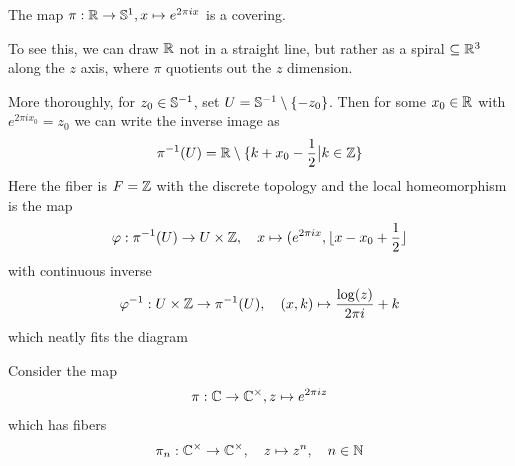 \begin{ex}[]
The map $\pi: \mathbb{R} \to \mathbb{S}^{1}, x \mapsto e^{2 \pi i x}$ is a covering.

To see this, we can draw $\mathbb{R}$ not in a straight line, but rather as a spiral $\subseteq \mathbb{R}^{3}$ along the $z$ axis, where $\pi$ quotients out the $z$ dimension.

More thoroughly, for $z_0 \in \mathbb{S}^{-1}$, set $U = \mathbb{S}^{-1}\setminus \{-z_0\}$.
Then for some $x_0 \in \mathbb{R}$ with $e^{2 \pi i x_0} = z_0$ we can write the inverse image as
\begin{align*}
  \pi^{-1}(U) = \mathbb{R} \setminus \{k + x_0 - \frac{1}{2} \big\vert k \in \mathbb{Z}\}
\end{align*}
Here the fiber is $F= \mathbb{Z}$ with the discrete topology and the local homeomorphism is the map
\begin{align*}
  \varphi: \pi^{-1}(U) \to  U \times \mathbb{Z}, \quad x \mapsto  (e^{2 \pi i x}, \lfloor x - x_0 + \frac{1}{2}\rfloor
\end{align*}
with continuous inverse
\begin{align*}
  \varphi^{-1}: U \times \mathbb{Z} \to  \pi^{-1}(U), \quad (x,k) \mapsto  \frac{\log(z)}{2 \pi i} + k
\end{align*}
which neatly fits the diagram
\begin{center}
\end{center}
\end{ex}

\begin{ex}[]
Consider the map
\begin{align*}
  \pi: \mathbb{C} \to \mathbb{C}^{\times}, z \mapsto e^{2 \pi i z}
\end{align*}
which has fibers
\begin{align*}
  \pi_n: \mathbb{C}^{\times} \to \mathbb{C}^{\times}, \quad z \mapsto z^{n}, \quad n \in \mathbb{N}
\end{align*}
\end{ex}
